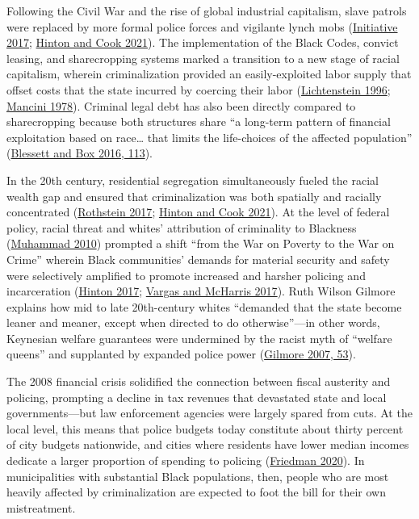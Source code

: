 \documentclass[
  12pt,
]{article}
\begin{document}
Following the Civil War and the rise of global industrial capitalism, slave patrols were replaced by more formal police forces and vigilante lynch mobs (\protect\hyperlink{ref-EqualJusticeInitiative2017}{Initiative 2017}; \protect\hyperlink{ref-Hinton2021}{Hinton and Cook 2021}). The implementation of the Black Codes, convict leasing, and sharecropping systems marked a transition to a new stage of racial capitalism, wherein criminalization provided an easily-exploited labor supply that offset costs that the state incurred by coercing their labor (\protect\hyperlink{ref-Lichtenstein1996}{Lichtenstein 1996}; \protect\hyperlink{ref-Mancini1978}{Mancini 1978}). Criminal legal debt has also been directly compared to sharecropping because both structures share ``a long-term pattern of financial exploitation based on race\ldots{} that limits the life-choices of the affected population'' (\protect\hyperlink{ref-Blessett2016}{Blessett and Box 2016, 113}).

In the 20th century, residential segregation simultaneously fueled the racial wealth gap and ensured that criminalization was both spatially and racially concentrated (\protect\hyperlink{ref-Rothstein2017}{Rothstein 2017}; \protect\hyperlink{ref-Hinton2021}{Hinton and Cook 2021}). At the level of federal policy, racial threat and whites' attribution of criminality to Blackness (\protect\hyperlink{ref-Muhammad2010}{Muhammad 2010}) prompted a shift ``from the War on Poverty to the War on Crime'' wherein Black communities' demands for material security and safety were selectively amplified to promote increased and harsher policing and incarceration (\protect\hyperlink{ref-Hinton2017}{Hinton 2017}; \protect\hyperlink{ref-Vargas2017a}{Vargas and McHarris 2017}). Ruth Wilson Gilmore explains how mid to late 20th-century whites ``demanded that the state become leaner and meaner, except when directed to do otherwise''---in other words, Keynesian welfare guarantees were undermined by the racist myth of ``welfare queens'' and supplanted by expanded police power (\protect\hyperlink{ref-Gilmore2007}{Gilmore 2007, 53}).

The 2008 financial crisis solidified the connection between fiscal austerity and policing, prompting a decline in tax revenues that devastated state and local governments---but law enforcement agencies were largely spared from cuts. At the local level, this means that police budgets today constitute about thirty percent of city budgets nationwide, and cities where residents have lower median incomes dedicate a larger proportion of spending to policing (\protect\hyperlink{ref-Friedman2020}{Friedman 2020}). In municipalities with substantial Black populations, then, people who are most heavily affected by criminalization are expected to foot the bill for their own mistreatment.
\end{document}
